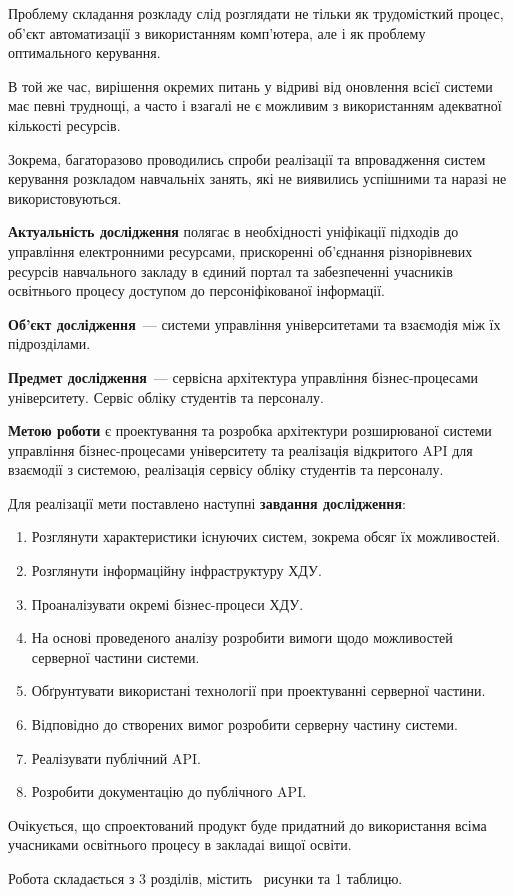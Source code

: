 Проблему складання розкладу слід розглядати не тільки як трудомісткий процес, об'єкт автоматизації з використанням комп’ютера, але і як проблему оптимального керування. 

В той же час, вирішення окремих питань у відриві від оновлення всієї системи має певні труднощі, а часто і взагалі не є можливим з використанням адекватної кількості ресурсів.

Зокрема, багаторазово проводились спроби реалізації та впровадження систем керування розкладом навчальніх занять, які не виявились успішними та наразі не використовуються.

\textbf{Актуальність дослідження} полягає в необхідності уніфікації підходів до управління електронними ресурсами, прискоренні об’єднання різнорівневих ресурсів навчального закладу в єдиний портал та забезпеченні учасників освітнього процесу доступом до персоніфікованої інформації.

\textbf{Об’єкт дослідження}~--- системи управління університетами та взаємодія між їх підрозділами.

\textbf{Предмет дослідження}~--- сервісна архітектура управління бізнес-процесами університету. Сервіс обліку студентів та персоналу.

\textbf{Метою роботи} є проектування та розробка архітектури розширюваної системи управління бізнес-процесами університету та реалізація відкритого API для взаємодії з системою, реалізація сервісу обліку студентів та персоналу.

Для реалізації мети поставлено наступні \textbf{завдання дослідження}:
\begin{enumerate}
	\item Розглянути характеристики існуючих систем, зокрема обсяг їх можливостей.
	\item Розглянути інформаційну інфраструктуру ХДУ.
	\item Проаналізувати окремі бізнес-процеси ХДУ.
	\item На основі проведеного аналізу розробити вимоги щодо можливостей серверної частини системи.
	\item Обґрунтувати використані технології при проектуванні серверної частини.
	\item Відповідно до створених вимог розробити серверну частину системи.
	\item Реалізувати публічний API.
	\item Розробити документацію до публічного API.
	
\end{enumerate}

Очікується, що спроектований продукт буде придатний до використання всіма учасниками освітнього процесу в закладаі вищої освіти.

Робота складається з 3 розділів, містить \totalfigures\ рисунки та 1 таблицю. 
